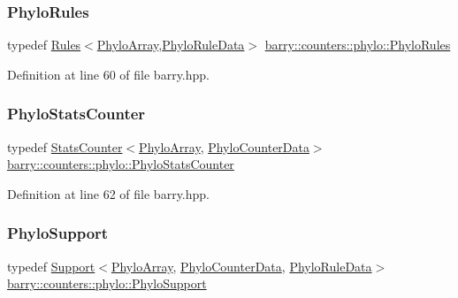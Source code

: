\subsubsection{\texorpdfstring{Phylo\+Rules}{PhyloRules}}
{\footnotesize\ttfamily typedef \hyperlink{classbarry_1_1_rules}{Rules}$<$\hyperlink{namespacebarry_1_1counters_1_1phylo_abd293bf65e494e903639fb5fb2c91604}{Phylo\+Array},\hyperlink{namespacebarry_1_1counters_1_1phylo_a5da540950bcf3372bcedb17a5b23667c}{Phylo\+Rule\+Data}$>$ \hyperlink{namespacebarry_1_1counters_1_1phylo_a7c915b4eab922a92797db96a7e8917c4}{barry\+::counters\+::phylo\+::\+Phylo\+Rules}}



Definition at line 60 of file barry.\+hpp.

\mbox{\label{namespacebarry_1_1counters_1_1phylo_abfefb6cff81a19d278b306a79cc011a3}} 
\subsubsection{\texorpdfstring{Phylo\+Stats\+Counter}{PhyloStatsCounter}}
{\footnotesize\ttfamily typedef \hyperlink{classbarry_1_1_stats_counter}{Stats\+Counter}$<$\hyperlink{namespacebarry_1_1counters_1_1phylo_abd293bf65e494e903639fb5fb2c91604}{Phylo\+Array}, \hyperlink{namespacebarry_1_1counters_1_1phylo_a6ecc0d8ab76f8dc2db152221a8e9e95a}{Phylo\+Counter\+Data}$>$ \hyperlink{namespacebarry_1_1counters_1_1phylo_abfefb6cff81a19d278b306a79cc011a3}{barry\+::counters\+::phylo\+::\+Phylo\+Stats\+Counter}}



Definition at line 62 of file barry.\+hpp.

\mbox{\label{namespacebarry_1_1counters_1_1phylo_a29ed06e87d808c2e7d333aa00a0643b5}} 
\subsubsection{\texorpdfstring{Phylo\+Support}{PhyloSupport}}
{\footnotesize\ttfamily typedef \hyperlink{classbarry_1_1_support}{Support}$<$\hyperlink{namespacebarry_1_1counters_1_1phylo_abd293bf65e494e903639fb5fb2c91604}{Phylo\+Array}, \hyperlink{namespacebarry_1_1counters_1_1phylo_a6ecc0d8ab76f8dc2db152221a8e9e95a}{Phylo\+Counter\+Data}, \hyperlink{namespacebarry_1_1counters_1_1phylo_a5da540950bcf3372bcedb17a5b23667c}{Phylo\+Rule\+Data}$>$ \hyperlink{namespacebarry_1_1counters_1_1phylo_a29ed06e87d808c2e7d333aa00a0643b5}{barry\+::counters\+::phylo\+::\+Phylo\+Support}}



